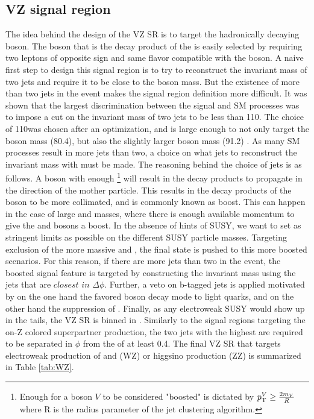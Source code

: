 \subsection*{VZ signal region}
\noindent
\justify
The idea behind the design of the VZ SR is to target the hadronically decaying \PW boson.
The \PZ boson that is the decay product of the \PSGczDt is easily selected by requiring two leptons of opposite sign and same flavor compatible with the \PZ boson.
A naive first step to design this signal region is to try to reconstruct the invariant mass of two jets and require it to be close to the \PW boson mass.
But the existence of more than two jets in the event makes the signal region definition more difficult.  
It was shown that the largest discrimination between the signal and SM processes was to impose a cut on the invariant mass of two jets to be less than 110\GeV.
The choice of 110\GeV was chosen after an optimization, and is large enough to not only target the \PW boson mass (80.4\GeV), but also the slightly larger \PZ boson mass (91.2\GeV) \cite{PhysRevD.98.030001}. 
As many SM processes result in more jets than two, a choice on what jets to reconstruct the invariant mass with must be made.
The reasoning behind the choice of jets is as follows. 
A \PW boson with enough \pt\footnote{Enough \pt for a boson $V$ to be considered "boosted" is dictated by $p_{\mathrm{T}}^{V}\geq\frac{2m_{V}}{R}$ where R is the radius parameter of the jet clustering algorithm.} will result in the decay products to propagate in the direction of the mother particle.  
This results in the decay products of the \PW boson to be more collimated, and is commonly known as boost.
This can happen in the case of large \PSGczDt and \firstcharg masses, where there is enough available momentum to give the \PZ and \PW bosons a boost.
In the absence of hints of SUSY, we want to set as stringent limits as possible on the different SUSY particle masses. 
Targeting exclusion of the more massive \PSGczDt and \firstcharg, the final state is pushed to this more boosted scenarios.
For this reason, if there are more jets than two in the event, the boosted signal feature is targeted by constructing the invariant mass using the jets that are $closest$ $in$ $\Delta\phi$.
Further, a veto on b-tagged jets is applied motivated by on the one hand the favored \PW boson decay mode to light quarks, and on the other hand the suppression of \ttbar. 
Finally, as any electroweak SUSY would show up in the \ptmiss tails, the VZ SR is binned in \ptmiss. 
Similarly to the signal regions targeting the on-Z colored superpartner production, the two jets with the highest \pt are required to be separated in $\phi$ from the \ptmiss of at least 0.4.
The final VZ SR that targets electroweak production of \PSGczDt and \firstcharg (WZ) or higgsino production (ZZ) is summarized in Table \ref{tab:WZ}.    

